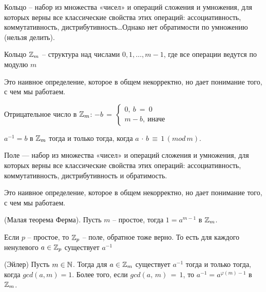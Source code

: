 \Def Кольцо -- набор из множества «чисел» и операций сложения и
умножения, для которых верны все классические свойства этих
операций: ассоциативность, коммутативность,
дистрибутивность\dots Однако нет обратимости по умножению (нельзя
делить).

\Def Кольцо $\mathbb{Z}_m$ -- структура над числами $0, 1, \dots , m - 1$, где все
операции ведутся по модулю $m$

\Note Это наивное определение, которое в общем некорректно, но дает понимание того, с чем мы работаем.

\Def Отрицательное число в $\mathbb{Z}_m$: \space
$-b\,=\,
\begin{cases}
0,\:b\:=\:0\\
m - b,\:\text{иначе}
\end{cases}$

\Def $a^{-1} = b$ в $\mathbb{Z}_m$ тогда и только тогда, когда $a\,\cdot\,b\,\equiv\,1\,(mod \,m)$.

\Def Поле — набор из множества «чисел» и операций сложения и умножения, для которых верны все классические свойства этих операций: ассоциативность, коммутативность, дистрибутивность и обратимость.

\Note Это наивное определение, которое в общем некорректно, но дает понимание того, с чем мы работаем.

\Thbd (Малая теорема Ферма). Пусть $m$ -- простое, тогда
$1 = a^{m - 1}$ в $\mathbb{Z}_m$.

\Consequence Если $p$ -- простое, то $\mathbb{Z}_p$ -- поле, обратное тоже верно. То
есть для каждого ненулевого $a \in \mathbb{Z}_p$ существует $a^{-1}$

\Thbd  (Эйлер) Пусть $m \in \mathbb{N}$. Тогда для $a \in \mathbb{Z}_m$ существует  $a^{-1}$ тогда и только тогда, когда $gcd(a, m) = 1$. Более того, если $gcd(a,\,m)\,=\,1$, то $a^{-1} = a^{\varphi(m)-1}$ в $\mathbb{Z}_m$.


\pagebreak